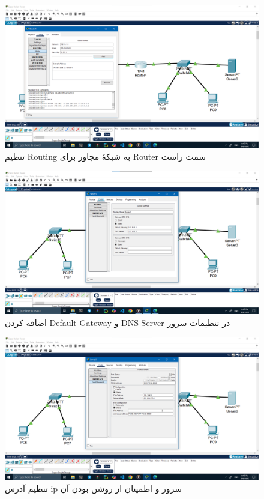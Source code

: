 \documentclass[12pt]{article}
\begin{document}
	\begin{figure}[H]
		\centering
		\includegraphics[width=\textwidth]{resources/scenario2-7.png}
		\caption{تنظیم \textenglish{Routing} به شبکهٔ مجاور برای \textenglish{Router} سمت راست}
		\label{2:7}
	\end{figure}
	\begin{figure}[H]
		\centering
		\includegraphics[width=\textwidth]{resources/scenario2-8.png}
		\caption{اضافه کردن \textenglish{Default Gateway} و \textenglish{DNS Server} در تنظیمات سرور}
		\label{2:8}
	\end{figure}
	\begin{figure}[H]
		\centering
		\includegraphics[width=\textwidth]{resources/scenario2-9.png}
		\caption{تنظیم آدرس \textenglish{ip} سرور و اطمینان از روشن بودن آن}
		\label{2:9}
	\end{figure}
\end{document}

